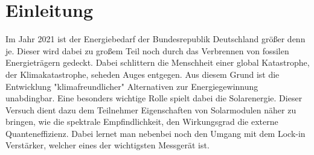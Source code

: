 

\chapter{Einleitung}
\label{chap:einleitung}

Im Jahr 2021 ist der Energiebedarf der Bundesrepublik Deutschland größer denn je. Dieser wird dabei zu großem Teil noch durch das Verbrennen von 
fossilen Energieträgern gedeckt. Dabei schlittern die Menschheit einer global Katastrophe, der 
Klimakatastrophe, seheden Auges entgegen. Aus diesem Grund ist die Entwicklung "klimafreundlicher" Alternativen zur Energiegewinnung unabdingbar.
Eine besonders wichtige Rolle spielt dabei die Solarenergie. Dieser Versuch dient dazu dem Teilnehmer Eigenschaften von Solarmodulen näher zu  bringen, 
wie die spektrale Empfindlichkeit, den Wirkungsgrad die externe Quanteneffizienz. Dabei lernet man nebenbei noch den Umgang mit dem Lock-in Verstärker, 
welcher eines der wichtigsten Messgerät ist.